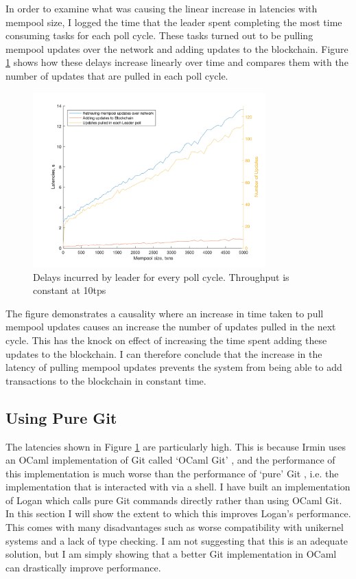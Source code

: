 \documentclass[12pt,a4paper,twoside,openright]{report}
\begin{document}
	In order to examine what was causing the linear increase in latencies with mempool size, I logged the time that the leader spent completing the most time consuming tasks for each poll cycle.
	These tasks turned out to be pulling mempool updates over the network and adding updates to the blockchain.
	Figure \ref{figs:leaderdelays} shows how these delays increase linearly over time and compares them with the number of updates that are pulled in each poll cycle.
	\begin{figure}
		\centering
		\includegraphics[width=0.8\textwidth]{figs/leader_delays_num_pulled.png}
		\caption{Delays incurred by leader for every poll cycle. Throughput is constant at 10tps}
		\label{figs:leaderdelays}
	\end{figure}
	The figure demonstrates a causality where an increase in time taken to pull mempool updates causes an increase the number of updates pulled in the next cycle. 
	This has the knock on effect of increasing the time spent adding these updates to the blockchain.
	I can therefore conclude that the increase in the latency of pulling mempool updates prevents the system from being able to add transactions to the blockchain in constant time. \\

	\subsection{Using Pure Git}
	The latencies shown in Figure \ref{figs:leaderdelays} are particularly high. 
	This is because Irmin uses an OCaml implementation of Git called `OCaml Git' \cite{OcamlGit}, and the performance of this implementation is much worse than the performance of `pure' Git \cite{Git}, i.e. the implementation that is interacted with via a shell.
	I have built an implementation of Logan which calls pure Git commands directly rather than using OCaml Git.
	In this section I will show the extent to which this improves Logan's performance.
	This comes with many disadvantages such as worse compatibility with unikernel systems and a lack of type checking.
	I am not suggesting that this is an adequate solution, but I am simply showing that a better Git implementation in OCaml can drastically improve performance.\\ 
\end{document}
